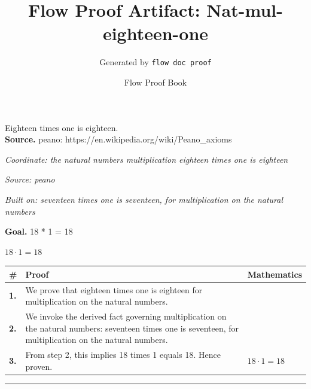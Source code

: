 \documentclass[11pt]{article}
\title{Flow Proof Artifact: Nat-mul-eighteen-one}
\author{Generated by \texttt{flow doc proof}}
\date{Flow Proof Book}
\theoremstyle{definition}
\begin{document}
\maketitle
Eighteen times one is eighteen.\\[0.5em]
\textbf{Source.} peano: https://en.wikipedia.org/wiki/Peano\_axioms\\[0.5em]
\bigskip
{}\par
\smallskip\noindent\textit{Coordinate: the natural numbers \cdot multiplication \cdot eighteen times one is eighteen}\par
\smallskip\noindent\textit{Source: peano}\par
\smallskip\noindent\textit{Built on: seventeen times one is seventeen, for multiplication on the natural numbers}\par
\medskip
\noindent\textbf{Goal.} 18 * 1 = 18\par
\noindent$\displaystyle 18 \cdot 1 = 18$\par
\medskip
\noindent
\begin{tabular}{@{} >{\raggedright\arraybackslash}p{} >{\raggedright\arraybackslash}p{} >{\raggedleft\arraybackslash}p{} @{}}
\textbf{\#} & \textbf{Proof} & \textbf{Mathematics} \\
\midrule
\textbf{1.} & We prove that eighteen times one is eighteen for multiplication on the natural numbers. & \\[0.45em]
\textbf{2.} & We invoke the derived fact governing multiplication on the natural numbers: seventeen times one is seventeen, for multiplication on the natural numbers. & \\[0.45em]
\textbf{3.} & From step 2, this implies 18 times 1 equals 18. Hence proven. & $\displaystyle 18 \cdot 1 = 18$ \\[0.45em]
\bottomrule
\end{tabular}
\label{thm:Nat-multiplication-eighteen_times_one_is_eighteen}
\par\medskip\hrule
\end{document}
